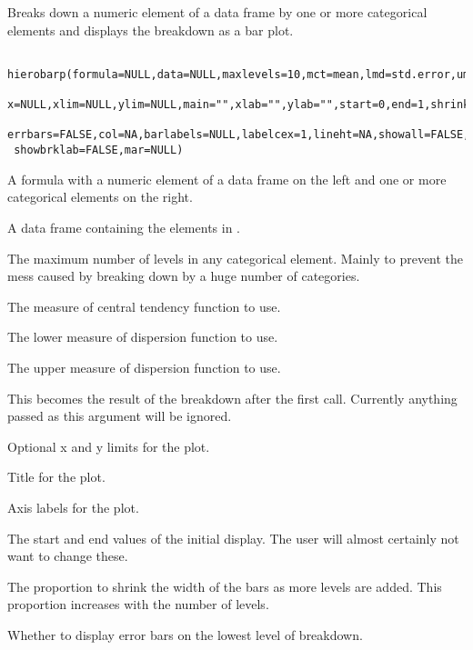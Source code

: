 \begin{Description}\relax
Breaks down a numeric element of a data frame by one or more
categorical elements and displays the breakdown as a bar plot.
\end{Description}
\begin{Usage}
\begin{verbatim}
 hierobarp(formula=NULL,data=NULL,maxlevels=10,mct=mean,lmd=std.error,umd=lmd,
 x=NULL,xlim=NULL,ylim=NULL,main="",xlab="",ylab="",start=0,end=1,shrink=0.02,
 errbars=FALSE,col=NA,barlabels=NULL,labelcex=1,lineht=NA,showall=FALSE,
 showbrklab=FALSE,mar=NULL)
\end{verbatim}
\end{Usage}
\begin{Arguments}
\begin{ldescription}
\item[\code{formula}] A formula with a numeric element of a data frame on the left and
one or more categorical elements on the right.
\item[\code{data}] A data frame containing the elements in .
\item[\code{maxlevels}] The maximum number of levels in any categorical element. Mainly to
prevent the mess caused by breaking down by a huge number of categories.
\item[\code{mct}] The measure of central tendency function to use.
\item[\code{lmd}] The lower measure of dispersion function to use.
\item[\code{umd}] The upper measure of dispersion function to use.
\item[\code{x}] This becomes the result of the breakdown after the first call. Currently
anything passed as this argument will be ignored.
\item[\code{xlim,ylim}] Optional x and y limits for the plot.
\item[\code{main}] Title for the plot.
\item[\code{xlab,ylab}] Axis labels for the plot.
\item[\code{start,end}] The start and end values of the initial display. The user will
almost certainly not want to change these.
\item[\code{shrink}] The proportion to shrink the width of the bars as more levels are
added. This proportion increases with the number of levels.
\item[\code{errbars}] Whether to display error bars on the lowest level of breakdown.

\end{ldescription}
\end{Arguments}
